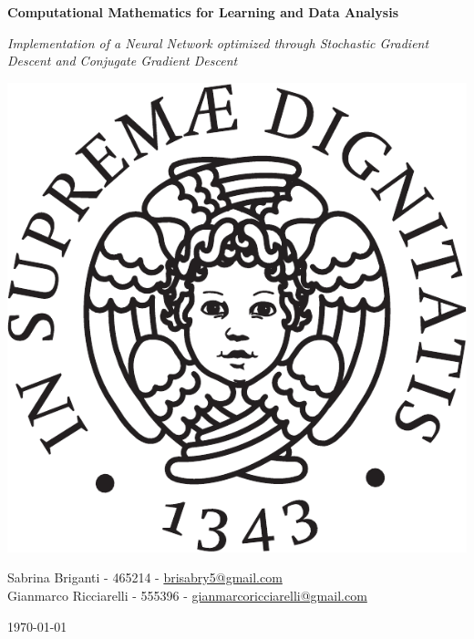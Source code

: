 \begin{center}
    \Huge
    \textbf{Computational Mathematics for Learning and Data Analysis}

    \vspace*{1cm}

    \LARGE
        \textit{
        Implementation of a Neural Network optimized through Stochastic Gradient Descent and Conjugate Gradient
        Descent}

    \vfill

    \includegraphics[scale=0.5]{img/cherubino_black.pdf}

    \vspace*{1cm}

    \Large
    Sabrina Briganti - 465214 - \href{mailto:brisabry5@gmail.com}{brisabry5@gmail.com}\\
    Gianmarco Ricciarelli - 555396 - \href{mailto:gianmarcoricciarelli@gmail.com}
    {gianmarcoricciarelli@gmail.com}

    \vspace*{1cm}

    \today
\end{center}
